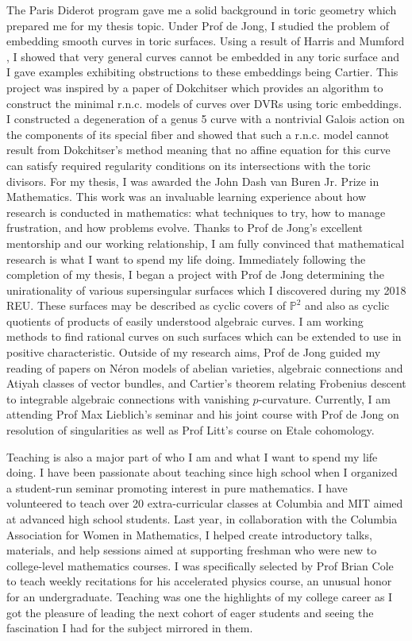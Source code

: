 \documentclass[11pt]{article}
\begin{document}
The Paris Diderot program gave me a solid background in toric geometry which prepared me for my thesis topic. Under Prof  de Jong, I studied the problem of embedding smooth curves in toric surfaces. Using a result of Harris and Mumford , I showed that very general curves cannot be embedded in any toric surface and I gave examples exhibiting obstructions to these embeddings being Cartier. This project was inspired by a paper of Dokchitser  which provides an algorithm to construct the minimal r.n.c. models of curves over DVRs using toric embeddings. I constructed a degeneration of a genus 5 curve with a nontrivial Galois action on the components of its special fiber and showed that such a r.n.c. model cannot result from Dokchitser's method meaning that no affine equation for this curve can satisfy required regularity conditions on its intersections with the toric divisors. For my thesis, I was awarded the John Dash van Buren Jr. Prize in Mathematics. This work was an invaluable learning experience about how research is conducted in mathematics: what techniques to try, how to manage frustration, and how problems evolve. Thanks to Prof de Jong’s excellent mentorship and our working relationship, I am fully convinced that mathematical research is what I want to spend my life doing. Immediately following the completion of my thesis, I began a project with Prof de Jong determining the unirationality of various supersingular surfaces which I discovered during my 2018 REU. These surfaces may be described as cyclic covers of $\mathbb{P}^2$ and also as cyclic quotients of products of easily understood algebraic curves. I am working methods to find rational curves on such surfaces which can be extended to use in positive characteristic. Outside of my research aims, Prof de Jong guided my reading of papers on N\'{e}ron models of abelian varieties, algebraic connections and Atiyah classes of vector bundles, and Cartier's theorem relating Frobenius descent to integrable algebraic connections with vanishing $p$-curvature. Currently, I am attending Prof Max Lieblich's seminar and his joint course with Prof de Jong on resolution of singularities as well as Prof Litt's course on Etale cohomology.
\par
Teaching is also a major part of who I am and what I want to spend my life doing. I have been passionate about teaching since high school when I organized a student-run seminar promoting interest in pure mathematics. I have volunteered to teach over 20 extra-curricular classes at Columbia and MIT aimed at advanced high school students. Last year, in collaboration with the Columbia Association for Women in Mathematics, I helped create introductory talks, materials, and help sessions aimed at supporting freshman who were new to college-level mathematics courses. I was specifically selected by Prof Brian Cole to teach weekly recitations for  his accelerated physics course, an unusual honor for an undergraduate. Teaching was one the highlights of my college career as I got the pleasure of leading the next cohort of eager students and seeing the fascination I had for the subject mirrored in them.
\end{document}
